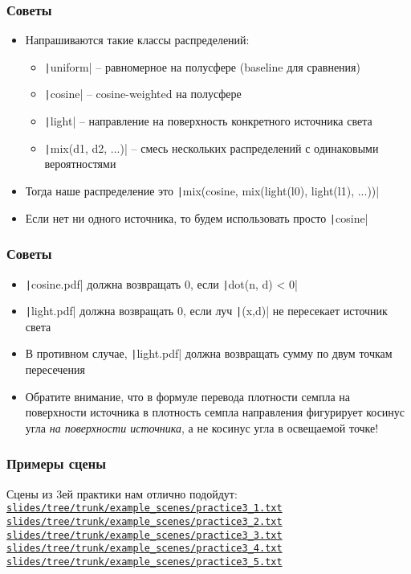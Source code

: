 \documentclass[10pt,handout]{beamer}
\begin{document}
\begin{frame}[fragile]
\frametitle{Советы}
\begin{itemize}
\item Напрашиваются такие классы распределений:
\begin{itemize}
\item \texttt|uniform| -- равномерное на полусфере (baseline для сравнения)
\item \texttt|cosine| -- cosine-weighted на полусфере
\item \texttt|light| -- направление на поверхность конкретного источника света
\item \texttt|mix(d1, d2, ...)| -- смесь нескольких распределений с одинаковыми вероятностями
\end{itemize}
\item Тогда наше распределение это \texttt|mix(cosine, mix(light(l0), light(l1), ...))|
\item Если нет ни одного источника, то будем использовать просто \texttt|cosine|
\end{itemize}
\end{frame}

\begin{frame}[fragile]
\frametitle{Советы}
\begin{itemize}
\item \texttt|cosine.pdf| должна возвращать 0, если \texttt|dot(n, d) < 0|
\item \texttt|light.pdf| должна возвращать 0, если луч \texttt|(x,d)| не пересекает источник света
\item В противном случае, \texttt|light.pdf| должна возвращать сумму по двум точкам пересечения
\item Обратите внимание, что в формуле перевода плотности семпла на поверхности источника в плотность семпла направления фигурирует косинус угла \textit{на поверхности источника}, а не косинус угла в освещаемой точке!
\end{itemize}
\end{frame}

\begin{frame}[fragile]
\frametitle{Примеры сцены}
Сцены из 3ей практики нам отлично подойдут:
\href{https://github.com/lisyarus/raytracing-course-slides/tree/trunk/example_scenes/practice3_1.txt}{\texttt{slides/tree/trunk/example\_scenes/practice3\_1.txt}}
\href{https://github.com/lisyarus/raytracing-course-slides/tree/trunk/example_scenes/practice3_2.txt}{\texttt{slides/tree/trunk/example\_scenes/practice3\_2.txt}}
\href{https://github.com/lisyarus/raytracing-course-slides/tree/trunk/example_scenes/practice3_3.txt}{\texttt{slides/tree/trunk/example\_scenes/practice3\_3.txt}}
\href{https://github.com/lisyarus/raytracing-course-slides/tree/trunk/example_scenes/practice3_4.txt}{\texttt{slides/tree/trunk/example\_scenes/practice3\_4.txt}}
\href{https://github.com/lisyarus/raytracing-course-slides/tree/trunk/example_scenes/practice3_5.txt}{\texttt{slides/tree/trunk/example\_scenes/practice3\_5.txt}}
\end{frame}
\end{document}

